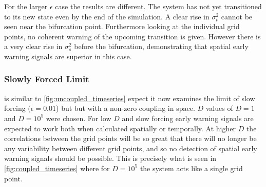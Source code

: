 For the larger $\epsilon$ case the results are different. The system has not yet transitioned to
its new state even by the end of the simulation. A clear rise in $\sigma_t^2$ cannot be seen near the bifurcation point. Furthermore looking at the individual grid points,
no coherent warning of the upcoming transition is given. However there is a very clear rise in $\sigma_s^2$ before the bifurcation, demonstrating that spatial early warning
signals are superior in this case.

\subsubsection{Slowly Forced Limit}
 is similar to \cref{fig:uncoupled_timeseries} expect it now examines the limit of slow forcing ($\epsilon = 0.01$) but
but with a non-zero coupling in space. $D$ values of $D = 1$ and $D = 10^5$ were chosen. For low $D$ and slow forcing early warning signals are expected to work both when calculated spatially or
temporally. At higher $D$ the correlations between the grid points will be so great that there will no longer be any variability between different grid points, and so no detection
of spatial early warning signals should be possible. This is precisely what is seen in \cref{fig:coupled_timeseries} where for $D=10^5$ the system acts like a single grid point.
